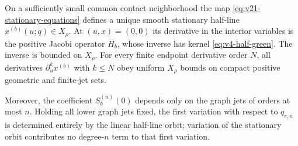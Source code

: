 \begin{proposition}
\label{prop:v21-stationary-calculus}
On a sufficiently small common contact neighborhood the map
\eqref{eq:v21-stationary-equations} defines a unique smooth stationary
half-line $x^{(b)}(u;q)\in X_\rho$.  At $(u,x)=(0,0)$ its derivative in the
interior variables is the positive Jacobi operator $H_b$, whose inverse has
kernel \eqref{eq:v4-half-green}.  The inverse is bounded on $X_\rho$.
For every finite endpoint derivative order $N$, all derivatives
$\partial_u^k x^{(b)}$ with $k\le N$ obey uniform $X_\rho$ bounds on compact
positive geometric and finite-jet sets.

Moreover, the coefficient $S_b^{(n)}(0)$ depends only on the graph jets of
orders at most $n$.  Holding all lower graph jets fixed, the first variation
with respect to $q_{r,n}$ is determined entirely by the linear half-line
orbit; variation of the stationary orbit contributes no degree-$n$ term to
that first variation.
\end{proposition}

